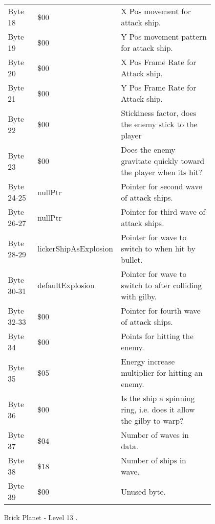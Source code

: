 \begin{figure}[H]
{\begin{adjustbox}{width=12cm}
\begin{tabular}{lll}
 Byte 18    & \$00                   & X Pos movement for attack ship.                                     \\
 Byte 19    & \$00                   & Y Pos movement pattern for attack ship.                             \\
 Byte 20    & \$00                   & X Pos Frame Rate for Attack ship.                                   \\
 Byte 21    & \$00                   & Y Pos Frame Rate for Attack ship.                                   \\
 Byte 22    & \$00                   & Stickiness factor, does the enemy stick to the player               \\
 Byte 23    & \$00                   & Does the enemy gravitate quickly toward the player when its hit?    \\
 Byte 24-25 & nullPtr               & Pointer for second wave of attack ships.                            \\
 Byte 26-27 & nullPtr               & Pointer for third wave of attack ships.                             \\
 Byte 28-29 & lickerShipAsExplosion & Pointer for wave to switch to when hit by bullet.                   \\
 Byte 30-31 & defaultExplosion      & Pointer for  wave to switch to after colliding with gilby.          \\
 Byte 32-33 & \$00                   & Pointer for fourth wave of attack ships.                            \\
 Byte 34    & \$00                   & Points for hitting the enemy.                                       \\
 Byte 35    & \$05                   & Energy increase multiplier for hitting an enemy.                    \\
 Byte 36    & \$00                   & Is the ship a spinning ring, i.e. does it allow the gilby to warp?  \\
 Byte 37    & \$04                   & Number of waves in data.                                            \\
 Byte 38    & \$18                   & Number of ships in wave.                                            \\
 Byte 39    & \$00                   & Unused byte.                                                        \\
\bottomrule
\end{tabular}

  \end{adjustbox}

  }\caption*{Brick Planet - Level 13
.}
\end{figure}

